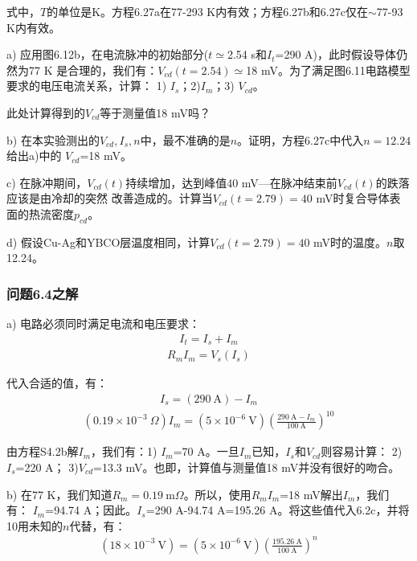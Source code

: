 式中，$T$的单位是K。方程6.27a在77-293 K内有效；方程6.27b和6.27c仅在$\sim $77-93 K内有效。

a) 应用图6.12b，在电流脉冲的初始部分($t\simeq$2.54 s和$I_t$=290 A)，此时假设导体仍然为77 K
是合理的，我们有：$V_{cd}(t=2.54)\simeq$18 mV。为了满足图6.11电路模型要求的电压电流关系，计算：
1) $I_s$；2)$I_m$；3) $V_{cd}$。

此处计算得到的$V_{cd}$等于测量值18 mV吗？

b) 在本实验测出的$V_{cd},I_s,n$中，最不准确的是$n$。证明，方程6.27c中代入$n=12.24$给出a)中的
$V_{cd}$=18 mV。

c) 在脉冲期间，$V_{cd}(t)$持续增加，达到峰值40 mV---在脉冲结束前$V_{cd}(t)$的跌落应该是由冷却的突然
改善造成的。计算当$V_{cd}(t=2.79)=40$ mV时复合导体表面的热流密度$p_{cd}$。

d) 假设Cu-Ag和YBCO层温度相同，计算$V_{cd}(t=2.79)=40$ mV时的温度。$n$取12.24。


\subsubsection{问题6.4之解}
a) 电路必须同时满足电流和电压要求：
\begin{align*}%
I_t=I_s+I_m \tag{S4.1a}
\end{align*}
\begin{align*}%
R_mI_m=V_s(I_s) \tag{S4.1b}
\end{align*}

代入合适的值，有：
\begin{align*}%
I_s=(290\ \mathrm{A})-I_m \tag{S4.2a}
\end{align*}
\begin{align*}%
(0.19\times10^{-3}\ \Omega)I_m=(5\times10^{-6}\ \mathrm{V})(\frac{290\ \mathrm {A}-I_m}{100\ \mathrm{A}})^{10} \tag{S4.2b}
\end{align*}

由方程S4.2b解$I_m$，我们有：1) $I_m$=70 A。一旦$I_m$已知，$I_s$和$V_{cd}$则容易计算：
2) $I_s$=220 A； 3)$V_{cd}$=13.3 mV。也即，计算值与测量值18 mV并没有很好的吻合。

b) 在77 K，我们知道$R_m=0.19\ \mathrm{m}\Omega$。所以，使用$R_m I_m$=18 mV解出$I_m$，我们有：
$I_m$=94.74 A；因此。$I_s$=290 A-94.74 A=195.26 A。将这些值代入6.2c，并将10用未知的$n$代替，有：
\begin{align*}%
(18\times10^{-3}\ \mathrm{V})=(5\times10^{-6}\ \mathrm{V})(\frac{195.26\ \mathrm{A}}{100\ \mathrm{A}})^n \tag{S4.3}
\end{align*}

